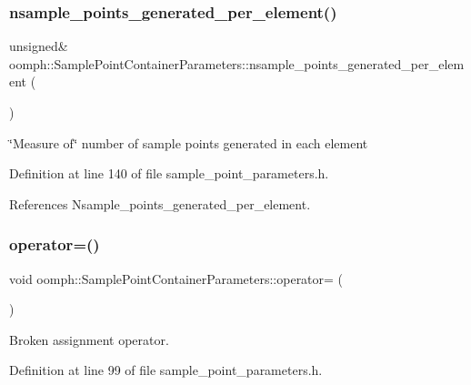 \subsubsection{\texorpdfstring{nsample\+\_\+points\+\_\+generated\+\_\+per\+\_\+element()}{nsample\_points\_generated\_per\_element()}\hspace{0.1cm}{\footnotesize\ttfamily [2/2]}}
{\footnotesize\ttfamily unsigned\& oomph\+::\+Sample\+Point\+Container\+Parameters\+::nsample\+\_\+points\+\_\+generated\+\_\+per\+\_\+element (\begin{DoxyParamCaption}{ }\end{DoxyParamCaption})\hspace{0.3cm}{\ttfamily [inline]}}



\char`\"{}\+Measure of\char`\"{} number of sample points generated in each element 



Definition at line 140 of file sample\+\_\+point\+\_\+parameters.\+h.



References Nsample\+\_\+points\+\_\+generated\+\_\+per\+\_\+element.

\mbox{\label{classoomph_1_1SamplePointContainerParameters_aa089aeff405b3e4362b4335a9acfb5a2}} 
\subsubsection{\texorpdfstring{operator=()}{operator=()}}
{\footnotesize\ttfamily void oomph\+::\+Sample\+Point\+Container\+Parameters\+::operator= (\begin{DoxyParamCaption}\item[{const \hyperlink{classoomph_1_1SamplePointContainerParameters}{Sample\+Point\+Container\+Parameters} \&}]{ }\end{DoxyParamCaption})\hspace{0.3cm}{\ttfamily [inline]}}



Broken assignment operator. 



Definition at line 99 of file sample\+\_\+point\+\_\+parameters.\+h.



